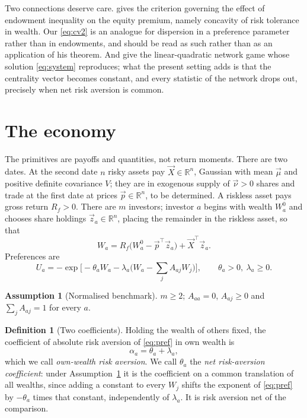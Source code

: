 \documentclass[12pt]{article}
\theoremstyle{definition}
\newtheorem{definition}{Definition}
\newtheorem{assumption}{Assumption}
\theoremstyle{remark}
\begin{document}
Two connections deserve care. \cite{gollier} gives the criterion governing the
effect of endowment inequality on the equity premium, namely concavity of risk
tolerance in wealth. Our \eqref{eq:cv2} is an analogue for dispersion in a
preference parameter rather than in endowments, and should be read as such
rather than as an application of his theorem. And \cite{ballester} give the
linear-quadratic network game whose solution \eqref{eq:system} reproduces; what
the present setting adds is that the centrality vector becomes constant, and
every statistic of the network drops out, precisely when net risk aversion is
common.

\section{The economy}

The primitives are payoffs and quantities, not return moments. There are two
dates. At the second date $n$ risky assets pay $\vec X\in\mathbb{R}^n$, Gaussian
with mean $\vec\mu$ and positive definite covariance $V$; they are in exogenous
supply of $\vec\nu>0$ shares and trade at the first date at prices
$\vec p\in\mathbb{R}^n$, to be determined. A riskless asset pays gross return
$R_f>0$. There are $m$ investors; investor $a$ begins with wealth $W_a^0$ and
chooses share holdings $\vec z_a\in\mathbb{R}^n$, placing the remainder in the
riskless asset, so that
%
\begin{equation}
W_a=R_f\big(W_a^0-\vec p^{\top}\vec z_a\big)+\vec X^{\top}\vec z_a .
\label{eq:wealth}
\end{equation}
%
Preferences are
%
\begin{equation}
U_a=-\exp\Big[-\theta_a W_a-\lambda_a\Big(W_a-\sum_jA_{aj}W_j\Big)\Big],
\qquad \theta_a>0,\ \lambda_a\geq0 .
\label{eq:pref}
\end{equation}

\begin{assumption}[Normalised benchmark]
\label{ass:norm}
$m\geq2$; $A_{aa}=0$, $A_{aj}\geq0$ and $\sum_jA_{aj}=1$ for every $a$.
\end{assumption}

\begin{definition}[Two coefficients]
\label{def:two}
Holding the wealth of others fixed, the coefficient of absolute risk aversion
of \eqref{eq:pref} in own wealth is
%
\begin{equation}
\alpha_a=\theta_a+\lambda_a ,
\label{eq:alpha}
\end{equation}
%
which we call \emph{own-wealth risk aversion}. We call $\theta_a$ the
\emph{net risk-aversion coefficient}: under Assumption~\ref{ass:norm} it is the
coefficient on a common translation of all wealths, since adding a constant to
every $W_j$ shifts the exponent of \eqref{eq:pref} by $-\theta_a$ times that
constant, independently of $\lambda_a$. It is risk aversion net of the
comparison.
\end{definition}
\end{document}
